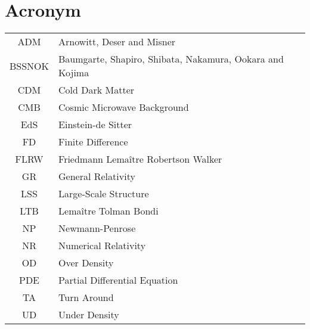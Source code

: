 \chapter{Acronym}
\begin{tabular}{cl}
ADM    & Arnowitt, Deser and Misner \\
BSSNOK & Baumgarte, Shapiro, Shibata, Nakamura, Ookara and Kojima \\
CDM    & Cold Dark Matter \\
CMB    & Cosmic Microwave Background \\
EdS    & Einstein-de Sitter \\
FD     & Finite Difference \\
FLRW   & Friedmann Lema{\^i}tre Robertson Walker \\
GR     & General Relativity \\
LSS    & Large-Scale Structure \\
LTB    & Lema{\^i}tre Tolman Bondi \\
NP     & Newmann-Penrose \\
NR     & Numerical Relativity \\
OD     & Over Density \\
PDE    & Partial Differential Equation \\
TA     & Turn Around \\
UD     & Under Density \\
\end{tabular}